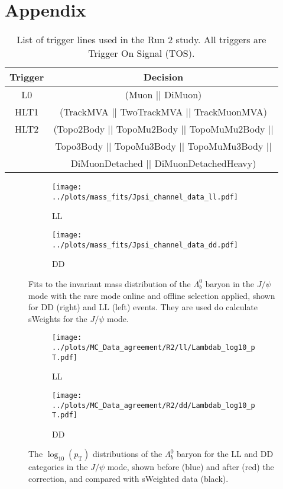 \chapter{Appendix}
\begin{table}
    \centering
    \caption{List of trigger lines used in the Run 2 study. All triggers are Trigger On Signal (TOS).}
    \label{tab:run2_trigger_lines}
    \begin{tabular}{c c}
        \toprule
        Trigger & Decision \\
        \midrule
        L0 & (Muon || DiMuon) \\
        HLT1 &  (TrackMVA || TwoTrackMVA || TrackMuonMVA) \\
        HLT2 &  (Topo2Body || TopoMu2Body || TopoMuMu2Body || \\
             &  Topo3Body || TopoMu3Body || TopoMuMu3Body || \\
             &  DiMuonDetached || DiMuonDetachedHeavy) \\
        \bottomrule
    \end{tabular}
\end{table}

\begin{figure}
   \centering
    \begin{subfigure}[b]{0.48\textwidth}
        \centering
        \texttt{[image: ../plots/mass\_fits/Jpsi\_channel\_data\_ll.pdf]}
        \caption{LL}
    \end{subfigure}
    \hfill
    \begin{subfigure}[b]{0.48\textwidth}
        \centering
        \texttt{[image: ../plots/mass\_fits/Jpsi\_channel\_data\_dd.pdf]}
        \caption{DD}
    \end{subfigure}
    \caption{Fits to the invariant mass distribution of the $\Lambda_b^0$ baryon in the $J/\psi$ mode with the rare mode online and offline selection applied, shown for DD (right) and LL (left) events. They are used do calculate sWeights for the $J/\psi$ mode.}
    \label{fig:run2_kinematic_corrections}
\end{figure}

\begin{figure}
   \centering
    \begin{subfigure}[b]{0.48\textwidth}
        \centering
        \texttt{[image: ../plots/MC\_Data\_agreement/R2/ll/Lambdab\_log10\_pT.pdf]}
        \caption{LL}
    \end{subfigure}
    \hfill
    \begin{subfigure}[b]{0.48\textwidth}
        \centering
        \texttt{[image: ../plots/MC\_Data\_agreement/R2/dd/Lambdab\_log10\_pT.pdf]}
        \caption{DD}
    \end{subfigure}
    \caption{The $\log_{10}(p_{\text{T}})$ distributions of the $\Lambda_b^0$ baryon for the LL and DD categories in the $J/\psi$ mode, shown before (blue) and after (red) the correction, and compared with sWeighted data (black).}
    \label{fig:run2_kinematic_corrections}
\end{figure}

